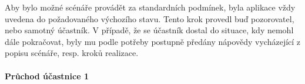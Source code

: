 Aby bylo možné scénáře provádět za standardních podmínek, byla aplikace vždy uvedena do požadovaného výchozího stavu. 
Tento krok provedl buď pozorovatel, nebo samotný účastník. 
V případě, že se účastník dostal do situace, kdy nemohl dále pokračovat, byly mu podle potřeby postupně předány nápovědy vycházející z popisu scénáře, resp. kroků realizace.









\paragraph{Průchod účastnice 1}

